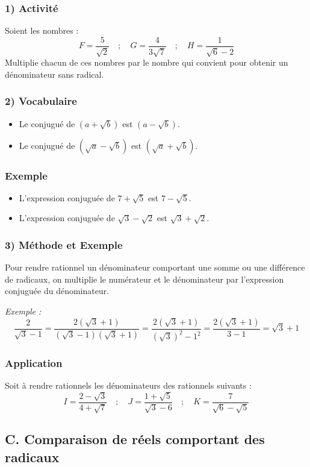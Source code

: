 \documentclass[12pt,a4paper]{article}
\begin{document}
\subsubsection*{\color{myred} 1) Activité}
Soient les nombres :
\[
F = \frac{5}{\sqrt{2}} \quad ; \quad G = \frac{4}{3\sqrt{7}} \quad ; \quad H = \frac{1}{\sqrt{6} - 2}
\]
Multiplie chacun de ces nombres par le nombre qui convient pour obtenir un dénominateur sans radical.
\subsubsection*{\color{myred} 2) Vocabulaire}
\begin{itemize}
\item Le conjugué de $(a + \sqrt{b})$ est $(a - \sqrt{b})$.
\item Le conjugué de $(\sqrt{a} - \sqrt{b})$ est $(\sqrt{a} + \sqrt{b})$.
\end{itemize}
\subsubsection*{\color{myred} Exemple}
\begin{itemize}
    \item L'expression conjuguée de $7 + \sqrt{5}$ est $7 - \sqrt{5}$.
    \item L'expression conjuguée de $\sqrt{3} - \sqrt{2}$ est $\sqrt{3} + \sqrt{2}$.
\end{itemize}
\subsubsection*{\color{myred} 3) Méthode et Exemple}
Pour rendre rationnel un dénominateur comportant une somme ou une différence de radicaux, on multiplie le numérateur et le dénominateur par l'expression conjuguée du dénominateur.

\noindent \textit{Exemple :}
\[
\frac{2}{\sqrt{3} - 1} = \frac{2(\sqrt{3} + 1)}{(\sqrt{3} - 1)(\sqrt{3} + 1)} = \frac{2(\sqrt{3} + 1)}{(\sqrt{3})^2 - 1^2} = \frac{2(\sqrt{3} + 1)}{3 - 1} = \sqrt{3} + 1
\]
\subsubsection*{\color{myred} Application}
Soit à rendre rationnels les dénominateurs des rationnels suivants :
\[
I = \frac{2 - \sqrt{3}}{4 + \sqrt{7}} \quad ; \quad J = \frac{1 + \sqrt{5}}{\sqrt{3} - 6} \quad ; \quad K = \frac{7}{\sqrt{6} - \sqrt{5}}
\]
\subsection*{C. Comparaison de réels comportant des radicaux}
\end{document}
